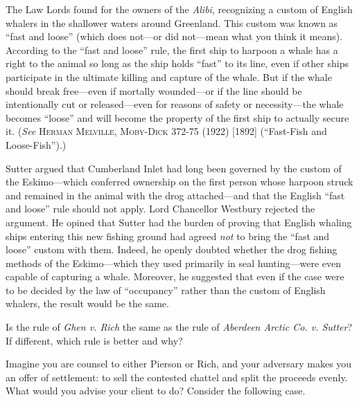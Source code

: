 The Law Lords found for the owners of the \textit{Alibi}, recognizing a custom
of English whalers in the shallower waters around Greenland. This custom was
known as ``fast and loose'' (which does not---or did not---mean what you think
it means). According to the ``fast and loose'' rule, the first ship to harpoon a
whale has a right to the animal so long as the ship holds ``fast'' to its line,
even if other ships participate in the ultimate killing and capture of the
whale. But if the whale should break free---even if mortally wounded---or if the
line should be intentionally cut or released---even for reasons of safety or
necessity---the whale becomes ``loose'' and will become the property of the
first ship to actually secure it. (\textit{See} \textsc{Herman Melville,
Moby-Dick} 372-75 (1922) [1892] (``Fast-Fish and Loose-Fish'').)

Sutter argued that Cumberland Inlet had long been governed by the custom of the
Eskimo---which conferred ownership on the first person whose harpoon struck and
remained in the animal with the drog attached---and that the English ``fast and
loose'' rule should not apply. Lord Chancellor Westbury rejected the argument.
He opined that Sutter had the burden of proving that English whaling ships
entering this new fishing ground had agreed \textit{not} to bring the ``fast and
loose'' custom with them. Indeed, he openly doubted whether the drog fishing
methods of the Eskimo---which they used primarily in seal hunting---were even
capable of capturing a whale. Moreover, he suggested that even if the case were
to be decided by the law of ``occupancy'' rather than the custom of English
whalers, the result would be the same.

Is the rule of \textit{Ghen v. Rich} the same as the rule of \textit{Aberdeen
Arctic Co. v. Sutter}? If different, which rule is better and why?


\item \label{ghen-settlement}Imagine you are counsel to either Pierson or Rich,
and your adversary makes you an offer of settlement: to sell the contested
chattel and split the proceeds evenly. What would you advise your client to do?
Consider the following case.


